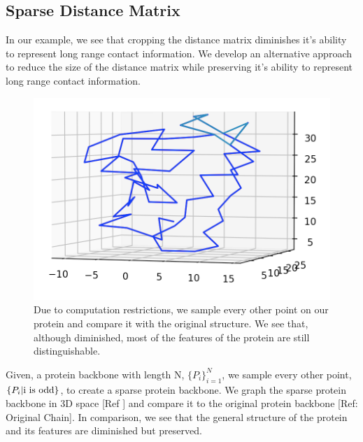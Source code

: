 \documentclass[12pt, a4paper, twocolumn, fullpage]{article}
\theoremstyle{plain}
\theoremstyle{definition}
\theoremstyle{remark}
\begin{document}
\subsection{ Sparse Distance Matrix}

In our example, we see that cropping the distance matrix diminishes it's ability to represent long range contact information. We develop an alternative approach to reduce the size of the distance matrix while preserving it's ability to represent long range contact information.

\begin{figure}[h]
    \centering
    \includegraphics[width=\linewidth]{1ux8sparse}
    \caption{Due to computation restrictions, we sample every other point on our protein and compare it with the original structure. We see that, although diminished, most of the features of the protein are still distinguishable.}
    \label{1ux8sparse}
\end{figure}

Given, a protein backbone with length N, $\{P_i\}^{N}_{i=1}$, we sample every other point, $\{P_i \space | \space \text{i is odd} \}$, to create a sparse protein backbone. We graph the sparse protein backbone in 3D space [Ref ] and compare it to the original protein backbone [Ref: Original Chain]. In comparison, we see that the general structure of the protein and its features are diminished but preserved.
\end{document}
